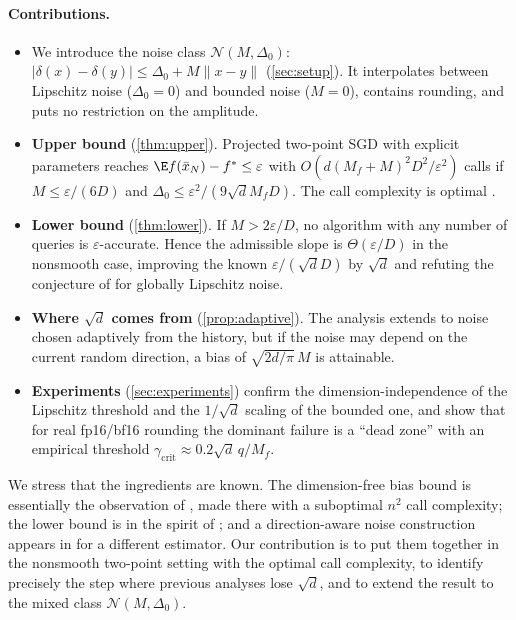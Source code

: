 \documentclass{article} %
\renewcommand{\eps}{\varepsilon}
\newcommand{\cN}{\mathcal{N}}
\newcommand{\norm}[1]{\lVert #1\rVert}
\theoremstyle{plain}
\theoremstyle{definition}
\theoremstyle{remark}
\begin{document}
\paragraph{Contributions.}
\begin{itemize}[leftmargin=1.3em,itemsep=1pt,topsep=2pt]
  \item We introduce the noise class $\cN(M,\Delta_0)$: $|\delta(x)-\delta(y)|\le\Delta_0+M\norm{x-y}$ (\cref{sec:setup}). It interpolates between Lipschitz noise ($\Delta_0=0$) and bounded noise ($M=0$), contains rounding, and puts no restriction on the amplitude.
  \item \textbf{Upper bound} (\cref{thm:upper}). Projected two-point SGD with explicit parameters reaches $\E f(\bar x_N)-f^*\le\eps$ with $O(d(M_f+M)^2D^2/\eps^2)$ calls if $M\le\eps/(6D)$ and $\Delta_0\le\eps^2/(9\sqrt dM_fD)$. The call complexity is optimal \citep{duchi2015optimal}.
  \item \textbf{Lower bound} (\cref{thm:lower}). If $M>2\eps/D$, no algorithm with any number of queries is $\eps$-accurate. Hence the admissible slope is $\Theta(\eps/D)$ in the nonsmooth case, improving the known $\eps/(\sqrt dD)$ by $\sqrt d$ and refuting the conjecture of \citet{dvinskikh2022noisy} for globally Lipschitz noise.
  \item \textbf{Where $\sqrt d$ comes from} (\cref{prop:adaptive}). The analysis extends to noise chosen adaptively from the history, but if the noise may depend on the current random direction, a bias of $\sqrt{2d/\pi}\,M$ is attainable.
  \item \textbf{Experiments} (\cref{sec:experiments}) confirm the dimension-independence of the Lipschitz threshold and the $1/\sqrt d$ scaling of the bounded one, and show that for real fp16/bf16 rounding the dominant failure is a ``dead zone'' with an empirical threshold $\gamma_{\mathrm{crit}}\approx0.2\sqrt d\,q/M_f$.
\end{itemize}

We stress that the ingredients are known. The dimension-free bias bound is essentially the observation of \citet[Sec.~4]{gasnikov2016inexact}, made there with a suboptimal $n^2$ call complexity; the lower bound is in the spirit of \citet[Prop.~E.7]{loginov2026minimax}; and a direction-aware noise construction appears in \citet[Remark~D.5]{loginov2026minimax} for a different estimator. Our contribution is to put them together in the nonsmooth two-point setting with the optimal call complexity, to identify precisely the step where previous analyses lose $\sqrt d$, and to extend the result to the mixed class $\cN(M,\Delta_0)$.
\end{document}
